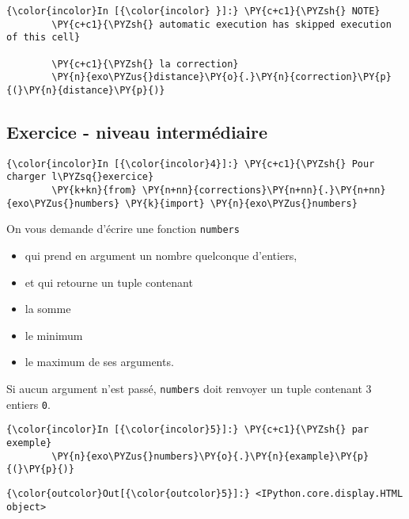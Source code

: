     \begin{Verbatim}[commandchars=\\\{\}]
{\color{incolor}In [{\color{incolor} }]:} \PY{c+c1}{\PYZsh{} NOTE}
        \PY{c+c1}{\PYZsh{} automatic execution has skipped execution of this cell}
        
        \PY{c+c1}{\PYZsh{} la correction}
        \PY{n}{exo\PYZus{}distance}\PY{o}{.}\PY{n}{correction}\PY{p}{(}\PY{n}{distance}\PY{p}{)}
\end{Verbatim}


    \hypertarget{exercice---niveau-intermuxe9diaire}{%
\subsection{Exercice - niveau
intermédiaire}\label{exercice---niveau-intermuxe9diaire}}

    \begin{Verbatim}[commandchars=\\\{\}]
{\color{incolor}In [{\color{incolor}4}]:} \PY{c+c1}{\PYZsh{} Pour charger l\PYZsq{}exercice}
        \PY{k+kn}{from} \PY{n+nn}{corrections}\PY{n+nn}{.}\PY{n+nn}{exo\PYZus{}numbers} \PY{k}{import} \PY{n}{exo\PYZus{}numbers}
\end{Verbatim}


    On vous demande d'écrire une fonction \texttt{numbers}

\begin{itemize}
\tightlist
\item
  qui prend en argument un nombre quelconque d'entiers,
\item
  et qui retourne un tuple contenant
\item
  la somme
\item
  le minimum
\item
  le maximum de ses arguments.
\end{itemize}

    Si aucun argument n'est passé, \texttt{numbers} doit renvoyer un tuple
contenant 3 entiers \texttt{0}.

    \begin{Verbatim}[commandchars=\\\{\}]
{\color{incolor}In [{\color{incolor}5}]:} \PY{c+c1}{\PYZsh{} par exemple}
        \PY{n}{exo\PYZus{}numbers}\PY{o}{.}\PY{n}{example}\PY{p}{(}\PY{p}{)}
\end{Verbatim}


\begin{Verbatim}[commandchars=\\\{\}]
{\color{outcolor}Out[{\color{outcolor}5}]:} <IPython.core.display.HTML object>
\end{Verbatim}
            
